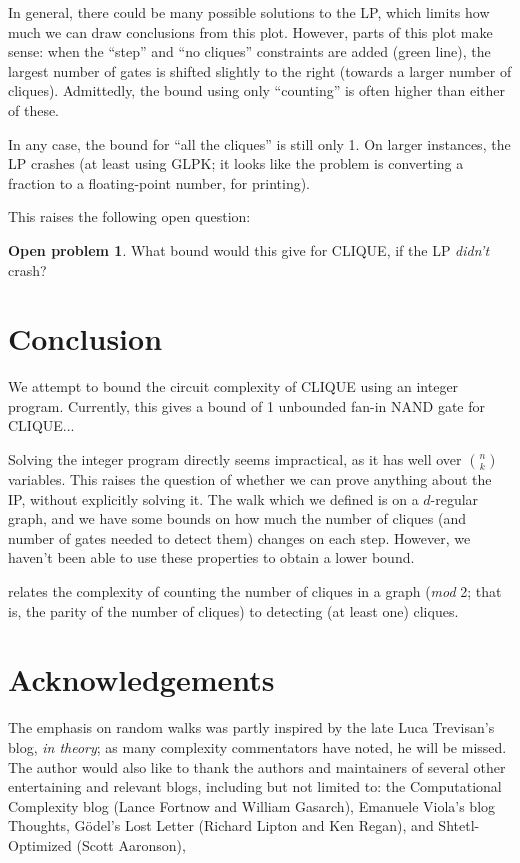 \documentclass[12pt]{article}
\theoremstyle{definition}
\newtheorem{prob}{Open problem}[section]
\begin{document}
In general, there could be many possible solutions to the LP, which
limits how much we can draw conclusions from this plot.  However,
parts of this plot make sense: when the ``step'' and ``no cliques''
constraints are added (green line), the largest number of gates is
shifted slightly to the right (towards a larger number of cliques).
Admittedly, the bound using only ``counting'' is often higher than
either of these.

In any case, the bound for ``all the cliques'' is still only 1.  On
larger instances, the LP crashes (at least using GLPK; it looks
like the problem is converting a fraction to a floating-point number,
for printing).

This raises the following open question:

\begin{prob}
What bound would this give for CLIQUE, if the LP {\em didn't} crash?
\end{prob}


\section{Conclusion}

We attempt to bound the circuit complexity of CLIQUE using an integer program.
Currently, this gives a bound
of 1 unbounded fan-in NAND gate for CLIQUE...

Solving the integer program directly seems impractical, as it has well over
${n \choose k}$ variables. This raises the question of whether we can prove
anything about the IP, without explicitly solving it.
The walk which we defined is on a $d$-regular graph, and we have some bounds on
how much the number of cliques (and number of gates needed to detect them)
changes on each step. However, we haven't been able to use these properties
to obtain a lower bound.

\cite{goldreich2025counting} relates the complexity of
counting the number of cliques in a graph ({\em mod} 2; that is, the parity
of the number of cliques) to
detecting (at least one) cliques. 

\section{Acknowledgements}

The emphasis on random walks was partly inspired by the late Luca
Trevisan's blog, {\em in theory}; as many complexity commentators
have noted, he will be missed. The author would also like to thank
the authors and maintainers of several other entertaining and
relevant blogs, including but not limited to: the Computational
Complexity blog (Lance Fortnow and William Gasarch), Emanuele Viola's
blog Thoughts, G\"odel's Lost Letter (Richard Lipton and Ken Regan),
and Shtetl-Optimized (Scott Aaronson),



\end{document}
